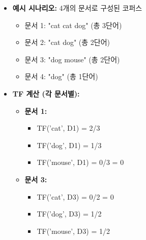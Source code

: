 \documentclass[11pt,a4paper]{article}
\begin{document}
\begin{itemize}
    \item \textbf{예시 시나리오:} 4개의 문서로 구성된 코퍼스
    \begin{itemize}
        \item 문서 1: "cat cat dog" (총 3단어)
        \item 문서 2: "cat dog" (총 2단어)
        \item 문서 3: "dog mouse" (총 2단어)
        \item 문서 4: "dog" (총 1단어)
    \end{itemize}

    \item \textbf{TF 계산 (각 문서별):}
    \begin{itemize}
        \item \textbf{문서 1:}
            \begin{itemize}
                \item TF('cat', D1) = 2/3
                \item TF('dog', D1) = 1/3
                \item TF('mouse', D1) = 0/3 = 0
            \end{itemize}
        \item \textbf{문서 3:}
            \begin{itemize}
                \item TF('cat', D3) = 0/2 = 0
                \item TF('dog', D3) = 1/2
                \item TF('mouse', D3) = 1/2
            \end{itemize}
    \end{itemize}


\end{itemize}
\end{document}
